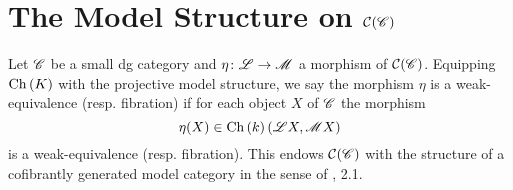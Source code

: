 \documentclass[dissertation.tex]{subfiles}
\begin{document}
        \section{The Model Structure on $\mathcal{C}(\mathscr{C})$}


        \begin{defn}
          Let $\mathscr{C}$ be a small dg category and $\eta \colon \mathscr{L} \to \mathscr{M}$ a morphism of $\mathcal{C}(\mathscr{C})$.
          Equipping $\operatorname{Ch}\left(K\right)$ with the projective model structure, we say the morphism $\eta$ is a weak-equivalence (resp. fibration) if for each object $X$ of $\mathscr{C}$ the morphism
          $$\eta(X) \in \operatorname{Ch}\left(k\right)(\mathscr{L}X, \mathscr{M}X)$$
          is a weak-equivalence (resp. fibration).
          This endows $\mathcal{C}(\mathscr{C})$ with the structure of a cofibrantly generated model category in the sense of \cite{HoveyMC}, 2.1.
        \end{defn}
\end{document}
